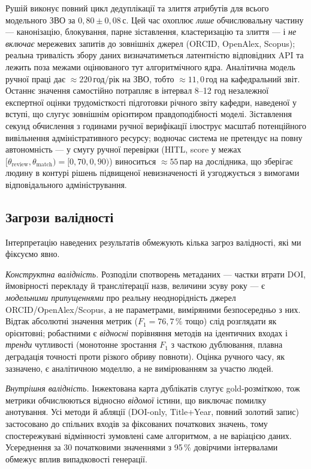 Рушій виконує повний цикл дедуплікації та злиття атрибутів для всього модельного ЗВО за $0{,}80 \pm 0{,}08$\,с. Цей час охоплює \textit{лише} обчислювальну частину --- канонізацію, блокування, парне зіставлення, кластеризацію та злиття --- і \textit{не включає} мережевих запитів до зовнішніх джерел (ORCID, OpenAlex, Scopus); реальна тривалість збору даних визначатиметься латентністю відповідних API та лежить поза межами оцінюваного тут алгоритмічного ядра. Аналітична модель ручної праці дає $\approx 220$\,год/рік на ЗВО, тобто $\approx 11{,}0$\,год на кафедральний звіт. Останнє значення самостійно потрапляє в інтервал 8--12 год незалежної експертної оцінки трудомісткості підготовки річного звіту кафедри, наведеної у вступі, що слугує зовнішнім орієнтиром правдоподібності моделі. Зіставлення секунд обчислення з годинами ручної верифікації ілюструє масштаб потенційного вивільнення адміністративного ресурсу; водночас система не претендує на повну автономність --- у смугу ручної перевірки (HITL, score у межах $[\theta_{\text{review}}, \theta_{\text{match}}) = [0{,}70, 0{,}90)$) виноситься $\approx 55$\,пар на дослідника, що зберігає людину в контурі рішень підвищеної невизначеності й узгоджується з вимогами відповідального адміністрування.

\subsection*{Загрози валідності}

Інтерпретацію наведених результатів обмежують кілька загроз валідності, які ми фіксуємо явно.

\textit{Конструктна валідність.} Розподіли спотворень метаданих --- частки втрати DOI, ймовірності перекладу й транслітерації назв, величини зсуву року --- є \textit{модельними припущеннями} про реальну неоднорідність джерел ORCID/OpenAlex/Scopus, а не параметрами, виміряними безпосередньо з них. Відтак абсолютні значення метрик ($F_1 = 76{,}7\,\%$ тощо) слід розглядати як орієнтовні; робастними є \textit{відносні} порівняння методів на ідентичних входах і \textit{тренди} чутливості (монотонне зростання $F_1$ з часткою дублювання, плавна деградація точності проти різкого обриву повноти). Оцінка ручного часу, як зазначено, є аналітичною моделлю, а не вимірюванням за участю людей.

\textit{Внутрішня валідність.} Інжектована карта дублікатів слугує gold-розміткою, тож метрики обчислюються відносно \textit{відомої} істини, що виключає помилку анотування. Усі методи й абляції (DOI-only, Title+Year, повний золотий запис) застосовано до спільних входів за фіксованих початкових значень, тому спостережувані відмінності зумовлені саме алгоритмом, а не варіацією даних. Усереднення за 30 початковими значеннями з 95\,\% довірчими інтервалами обмежує вплив випадковості генерації.

